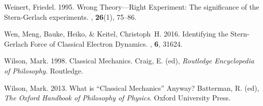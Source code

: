 \documentclass[12pt,secnumarabic,amsmath,amssymb,balancelastpage,nofootinbib]{article}
\begin{document}
\begin{thebibliography}{}
Weinert, Friedel. 1995.
\newblock Wrong Theory---Right Experiment: The significance of the
  Stern-Gerlach experiments.
, {\bf
  26}(1), 75--86.

Wen, Meng, Bauke, Heiko, \& Keitel, Christoph~H. 2016.
\newblock Identifying the Stern-Gerlach Force of Classical Electron Dynamics.
, {\bf 6}, 31624.

Wilson, Mark. 1998.
\newblock Classical Mechanics.
 Craig, E. (ed), {\em Routledge Encyclopedia of Philosophy}.
\newblock Routledge.

Wilson, Mark. 2013.
\newblock What is ``Classical Mechanics'' Anyway?
 Batterman, R. (ed), {\em The Oxford Handbook
  of Philosophy of Physics}.
\newblock Oxford University Press.

\end{thebibliography}
\end{document}

